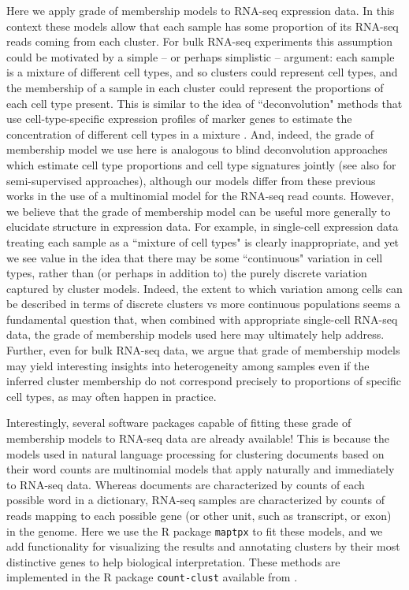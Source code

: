Here we apply grade of membership models to RNA-seq expression data. In this context these models allow that each
 sample has some proportion of its RNA-seq reads coming from each cluster. For bulk RNA-seq experiments this assumption 
could be motivated by a simple -- or perhaps simplistic -- argument: each sample is a mixture of different cell types, and so clusters 
could represent cell types, and the membership of a sample in each cluster could represent the proportions of each cell type present.
This is similar to the idea of ``deconvolution" methods that use cell-type-specific expression profiles of marker genes to estimate the concentration of different cell types in a mixture \cite{}. And, indeed, the grade of membership model we use here is analogous to blind deconvolution approaches \cite{Schwartz2010,Repsilber2010}
 which estimate cell type proportions and cell type signatures jointly (see also \cite{Shen-Orr2010,Qiao2012} for semi-supervised approaches), although 
 our models differ from these previous works in the use of a multinomial model for the RNA-seq read counts. 
However, we believe that the grade of membership model can be useful more generally to elucidate structure in expression data.
For example, in single-cell expression data treating each sample as a ``mixture of cell types" is clearly inappropriate, and yet we see value in the idea
that there may be some ``continuous" variation in cell types, rather than (or perhaps in addition to) the purely discrete variation captured by cluster models. 
Indeed, the extent to which variation among cells can be described in terms of discrete clusters vs more continuous populations
seems a fundamental question that, when combined with appropriate single-cell RNA-seq data, the grade of membership models used here may
ultimately help address. Further, even for bulk RNA-seq data, we argue that grade of membership models may yield interesting insights into heterogeneity among samples
even if the inferred cluster membership do not correspond precisely to proportions of specific cell types, as may often happen in practice.

Interestingly, several software packages capable of fitting these grade of membership models to RNA-seq data are already available! This is because
the models used in natural language processing for clustering documents based on their word counts are multinomial models that
apply naturally and immediately to RNA-seq data. Whereas documents are characterized by counts of each possible word in a dictionary, RNA-seq samples
are characterized by counts of reads mapping to each possible gene (or other unit, such as transcript, or exon) in the genome. 
Here we use the R package {\tt maptpx} \cite{Taddy2012} to fit these models, and we add functionality for visualizing the results and annotating
clusters by their most distinctive genes to help biological interpretation. These methods are implemented in the R package {\tt count-clust} available
from \url{}.  



